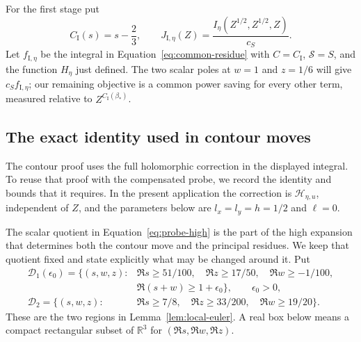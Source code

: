 \documentclass[11pt,a4paper]{article}
\numberwithin{equation}{section}
\numberwithin{figure}{section}
\theoremstyle{definition}
\theoremstyle{remark}
\begin{document}
For the first stage put
\[
 C_{\mathrm I}(s)=s-\frac23,\qquad
 J_{\mathrm I,\eta}(Z)=\frac{I_\eta(Z^{1/2},Z^{1/2},Z)}{c_S}.
\]
Let $f_{\mathrm I,\eta}$ be the integral in
Equation~\eqref{eq:common-residue} with $C=C_{\mathrm I}$,
$\mathcal S=S$, and the function $H_\eta$ just defined.  The two scalar poles
at $w=1$ and $z=1/6$ will give $c_S f_{\mathrm I,\eta}$; our remaining
objective is a common power saving for every other term, measured relative
to $Z^{C_{\mathrm I}(\beta_*)}$.

\subsection{The exact identity used in contour moves}

The contour proof uses the full holomorphic correction in the displayed
integral.  To reuse that proof with the compensated probe, we record the
identity and bounds that it requires.  In the present application the
correction is $\mathcal H_{\eta,u}$, independent of $Z$, and the parameters
below are $l_x=l_y=h=1/2$ and $\ell=0$.

The scalar quotient in Equation~\eqref{eq:probe-high} is the part of the
high expansion that determines both the contour move and the principal
residues.  We keep that quotient fixed and state explicitly what may be
changed around it.  Put
\[
 \begin{split}
 \mathcal D_1(\epsilon_0)=\{(s,w,z):{}&\Re s\ge51/100,\quad
       \Re z\ge17/50,\quad \Re w\ge-1/100,\\
       &\Re(s+w)\ge1+\epsilon_0\},\qquad \epsilon_0>0,\\
 \mathcal D_2=\{(s,w,z):{}&\Re s\ge7/8,\quad
       \Re z\ge33/200,\quad \Re w\ge19/20\}.
 \end{split}
\]
These are the two regions in Lemma~\ref{lem:local-euler}.  A real box below
means a compact rectangular subset of $\mathbb R^3$ for
$(\Re s,\Re w,\Re z)$.
\end{document}
